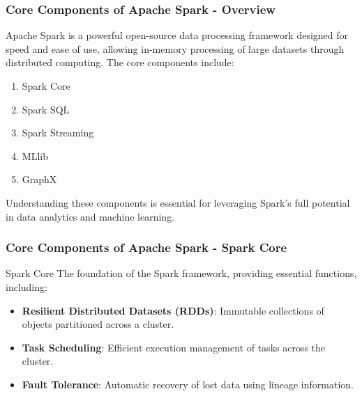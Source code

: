 \documentclass[aspectratio=169]{beamer}
\begin{document}
\begin{frame}[fragile]
    \frametitle{Core Components of Apache Spark - Overview}
    Apache Spark is a powerful open-source data processing framework designed for speed and ease of use, allowing in-memory processing of large datasets through distributed computing. The core components include:
    \begin{enumerate}
        \item Spark Core
        \item Spark SQL
        \item Spark Streaming
        \item MLlib
        \item GraphX
    \end{enumerate}
    Understanding these components is essential for leveraging Spark's full potential in data analytics and machine learning.
\end{frame}

\begin{frame}[fragile]
    \frametitle{Core Components of Apache Spark - Spark Core}
    \begin{block}{Spark Core}
        The foundation of the Spark framework, providing essential functions, including:
    \end{block}
    \begin{itemize}
        \item \textbf{Resilient Distributed Datasets (RDDs)}: Immutable collections of objects partitioned across a cluster.
        \item \textbf{Task Scheduling}: Efficient execution management of tasks across the cluster.
        \item \textbf{Fault Tolerance}: Automatic recovery of lost data using lineage information.
    \end{itemize}
\end{frame}
\end{document}
